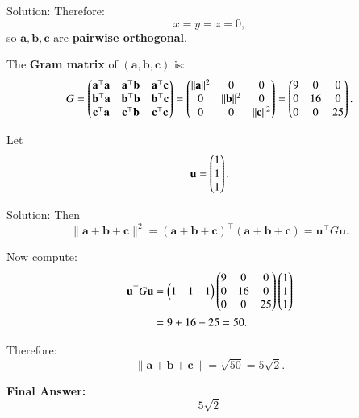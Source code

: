\documentclass{beamer}
\begin{document}
\begin{frame}{Solution:}
Therefore:
\begin{equation} \label{eq9}
x = y = z = 0,
\end{equation}
so $\mathbf{a}, \mathbf{b}, \mathbf{c}$ are \textbf{pairwise orthogonal}.

\bigskip

The \textbf{Gram matrix} of $ (\mathbf{a}, \mathbf{b}, \mathbf{c}) $ is:
\begin{equation} \label{eq10}
G =
\begin{pmatrix}
\mathbf{a}^\top \mathbf{a} & \mathbf{a}^\top \mathbf{b} & \mathbf{a}^\top \mathbf{c} \\
\mathbf{b}^\top \mathbf{a} & \mathbf{b}^\top \mathbf{b} & \mathbf{b}^\top \mathbf{c} \\
\mathbf{c}^\top \mathbf{a} & \mathbf{c}^\top \mathbf{b} & \mathbf{c}^\top \mathbf{c}
\end{pmatrix}
=
\begin{pmatrix}
\|\mathbf{a}\|^2 & 0 & 0 \\
0 & \|\mathbf{b}\|^2 & 0 \\
0 & 0 & \|\mathbf{c}\|^2
\end{pmatrix}
=
\begin{pmatrix}
9 & 0 & 0 \\
0 & 16 & 0 \\
0 & 0 & 25
\end{pmatrix}.
\end{equation}

Let
\[
\mathbf{u} = \begin{pmatrix}1 \\ 1 \\ 1\end{pmatrix}.
\]
\end{frame}

\begin{frame}{Solution:}
Then
\begin{equation} \label{eq11}
\|\mathbf{a} + \mathbf{b} + \mathbf{c}\|^2 = (\mathbf{a} + \mathbf{b} + \mathbf{c})^\top (\mathbf{a} + \mathbf{b} + \mathbf{c}) = \mathbf{u}^\top G \mathbf{u}.
\end{equation}

Now compute:
\begin{align}
\mathbf{u}^\top G \mathbf{u} 
&= \begin{pmatrix}1 & 1 & 1\end{pmatrix}
\begin{pmatrix}
9 & 0 & 0 \\
0 & 16 & 0 \\
0 & 0 & 25
\end{pmatrix}
\begin{pmatrix}1 \\ 1 \\ 1\end{pmatrix} \nonumber \\
&= 9 + 16 + 25 = 50. \label{eq12}
\end{align}

Therefore:
\begin{equation} \label{eq13}
\|\mathbf{a} + \mathbf{b} + \mathbf{c}\| = \sqrt{50} = 5\sqrt{2}.
\end{equation}

\bigskip

\textbf{Final Answer:}
\[
\boxed{5\sqrt{2}}
\]

\end{frame}
\end{document}
